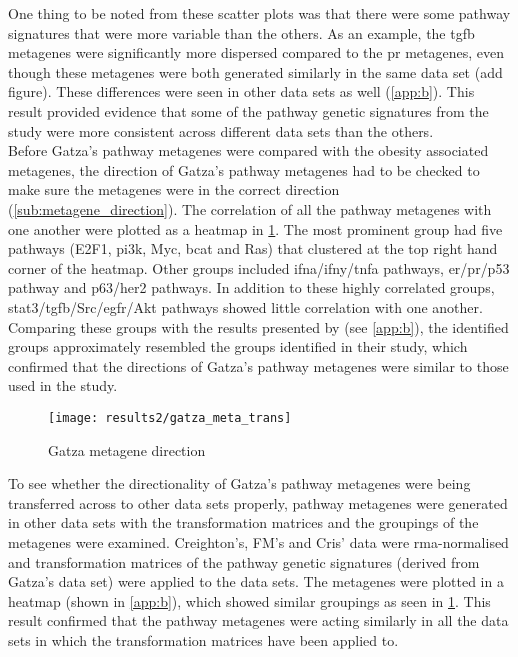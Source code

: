 One thing to be noted from these scatter plots was that there were some pathway signatures that were more variable than the others.
As an example, the \gls{tgfb} metagenes were significantly more dispersed compared to the \gls{pr} metagenes, even though these metagenes were both generated similarly in the same data set (add figure).
These differences were seen in other data sets as well (\cref{app:b}).
This result provided evidence that some of the pathway genetic signatures from the \citet{Gatza2010a} study were more consistent across different data sets than the others.
\\

\noindent
Before Gatza's pathway metagenes were compared with the obesity associated metagenes, the direction of Gatza's pathway metagenes had to be checked to make sure the metagenes were in the correct direction (\cref{sub:metagene_direction}).
The correlation of all the pathway metagenes with one another were plotted as a heatmap in \cref{fig:gatza_meta_dir}.
The most prominent group had five pathways (E2F1, \gls{pi3k}, Myc, \gls{bcat} and Ras) that clustered at the top right hand corner of the heatmap.
Other groups included \gls{ifna}/\gls{ifny}/\gls{tnfa} pathways, \gls{er}/\gls{pr}/p53 pathway and p63/\gls{her2} pathways.
In addition to these highly correlated groups, \gls{stat3}/\gls{tgfb}/Src/\gls{egfr}/Akt pathways showed little correlation with one another.
Comparing these groups with the results presented by \citet{Gatza2010a} (see \cref{app:b}), the identified groups approximately resembled the groups identified in their study, which confirmed that the directions of Gatza's pathway metagenes were similar to those used in the \citet{Gatza2010a} study.

\begin{figure}[htpb]
	\centering
	\texttt{[image: results2/gatza\_meta\_trans]}
	\caption{Gatza metagene direction}
	\label{fig:gatza_meta_dir}
\end{figure}

To see whether the directionality of Gatza's pathway metagenes were being transferred across to other data sets properly, pathway metagenes were generated in other data sets with the transformation matrices and the groupings of the metagenes were examined.
Creighton's, FM's and Cris' data were \gls{rma}-normalised and transformation matrices of the pathway genetic signatures (derived from Gatza's data set) were applied to the data sets.
The metagenes were plotted in a heatmap (shown in \cref{app:b}), which showed similar groupings  as seen in \cref{fig:gatza_meta_dir}.
This result confirmed that the pathway metagenes were acting similarly in all the data sets in which the transformation matrices have been applied to.

